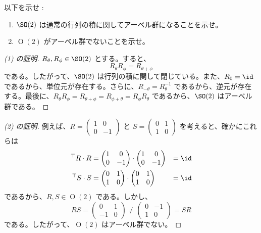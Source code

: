 \documentclass[article,paper=a4paper]{jlreq}
\begin{document}
\begin{prob}
    以下を示せ : 
    \begin{enumerate}[label=(\arabic*)\,]
        \item $\SO(2)$ は通常の行列の積に関してアーベル群になることを示せ。
        \item $\operatorname{O}(2)$ がアーベル群でないことを示せ。
    \end{enumerate}
\end{prob}

\begin{proof}[(1) の証明]
    $R_\theta, R_\phi \in \SO(2)$ とする。すると、
    \[
        R_\theta R_\phi = R_{\theta + \phi}
    \]
    である。したがって、$\SO(2)$ は行列の積に関して閉じている。また、$R_0 = \id$ であるから、単位元が存在する。さらに、$R_{-\theta} = R_\theta^{-1}$ であるから、逆元が存在する。最後に、$R_\theta R_\phi = R_{\theta + \phi} = R_{\phi + \theta} = R_\phi R_\theta$ であるから、$\SO(2)$ はアーベル群である。
\end{proof}

\begin{proof}[(2) の証明]
    例えば、$R = \begin{pmatrix}
        1 & 0\\
        0 & -1
    \end{pmatrix}$ と $S = \begin{pmatrix}
        0 & 1\\
        1 & 0
    \end{pmatrix}$ を考えると、確かにこれらは
    \begin{align*}
        {}^\top R \cdot R &= \begin{pmatrix}
            1 & 0\\
            0 & -1
        \end{pmatrix} \cdot \begin{pmatrix}
            1 & 0\\
            0 & -1
    \end{pmatrix} &= \id\\
        {}^\top S \cdot S &= \begin{pmatrix}
            0 & 1\\
            1 & 0
        \end{pmatrix} \cdot \begin{pmatrix}
            0 & 1\\
            1 & 0
    \end{pmatrix} &= \id
    \end{align*}
    であるから、$R, S \in \operatorname{O}(2)$ である。しかし、
    \[
        RS = \begin{pmatrix}
        0 & 1\\
        -1 & 0
    \end{pmatrix} \neq \begin{pmatrix}
        0 & -1\\
        1 & 0
    \end{pmatrix} = SR
    \]
    である。したがって、$\operatorname{O}(2)$ はアーベル群でない。
\end{proof}
\end{document}
